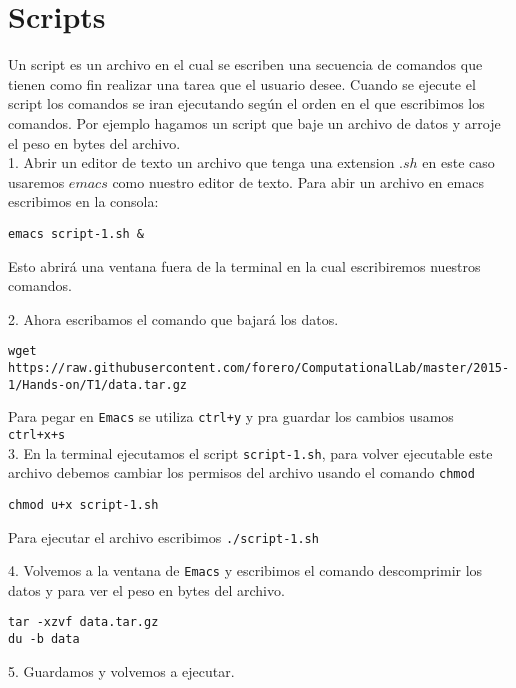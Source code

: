 \documentclass[12pt]{article}
\begin{document}


\section{Scripts}

Un script es un archivo en el cual se escriben una secuencia de comandos
que tienen como fin realizar una tarea que el usuario desee. Cuando se ejecute 
el script los comandos se iran ejecutando seg\'un el orden en el que escribimos los comandos. Por ejemplo hagamos un script que baje un archivo de datos y arroje el peso en bytes del archivo.\\

1. Abrir un editor de texto un archivo que tenga una extension $.sh$ en este 
caso usaremos $emacs$ como nuestro editor de texto. Para abir un archivo en emacs escribimos en la consola:\\
\begin{verbatim}
emacs script-1.sh &
\end{verbatim}
Esto abrir\'a una ventana fuera de la terminal en la cual escribiremos nuestros comandos.

2. Ahora escribamos el comando que bajar\'a los datos.

\begin{verbatim}
wget https://raw.githubusercontent.com/forero/ComputationalLab/master/2015-1/Hands-on/T1/data.tar.gz
\end{verbatim}

Para pegar en \verb+Emacs+ se utiliza \verb|ctrl+y| y pra guardar los cambios usamos \verb"ctrl+x+s"\\

3. En la terminal ejecutamos el script \verb+script-1.sh+, para volver ejecutable este archivo debemos cambiar los permisos 
del archivo usando el comando \verb+chmod+ \\

\begin{verbatim}
chmod u+x script-1.sh
\end{verbatim}


Para ejecutar el archivo escribimos \verb|./script-1.sh|

4. Volvemos a la ventana de \verb+Emacs+ y escribimos el comando descomprimir los datos y para ver el peso en bytes del archivo.

\begin{verbatim}
tar -xzvf data.tar.gz
du -b data
\end{verbatim}

5. Guardamos y volvemos a ejecutar.
\end{document}
